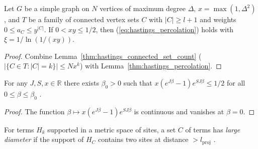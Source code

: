 \begin{lemma}
    \label{thm:hastings_percolation_connected}
    \leanok
    Let $G$ be a simple graph on $N$ vertices of maximum degree $\Delta$,
    $x=\max(1,\Delta^2)$, and $T$ be a family of connected vertex sets $C$ with
    $|C|\ge l+1$ and weights $0\le a_C\le y^{|C|}$. If $0<xy\le1/2$, then
    (\ref{eq:hastings_percolation}) holds with $\xi=1/\ln(1/(xy))$.
\end{lemma}
\begin{proof}
    \leanok
    Combine Lemma~\ref{thm:hastings_connected_set_count}
    ($|\{C\in T:|C|=k\}|\le Nx^k$) with Lemma~\ref{thm:hastings_percolation}.
\end{proof}

\begin{lemma}
    \label{thm:hastings_percolation_temperature}
    \leanok
    For any $J,S,x\in\mathbb R$ there exists $\beta_0>0$ such that
    $x(e^{J\beta}-1)e^{SJ\beta}\le1/2$ for all $0\le\beta\le\beta_0$
    \cite[lines 1242--1245]{Hastings2006Solving}.
\end{lemma}
\begin{proof}
    \leanok
    The function $\beta\mapsto x(e^{J\beta}-1)e^{SJ\beta}$ is continuous and
    vanishes at $\beta=0$.
\end{proof}

\begin{definition}
    \label{def:hastings_large_diameter}
    \leanok
    For terms $H_k$ supported in a metric space of sites, a set $C$ of terms has
    \emph{large diameter} if the support of $H_C$ contains two sites at distance
    $>l_{\mathrm{proj}}$ \cite[lines 1104--1107]{Hastings2006Solving}.
\end{definition}


